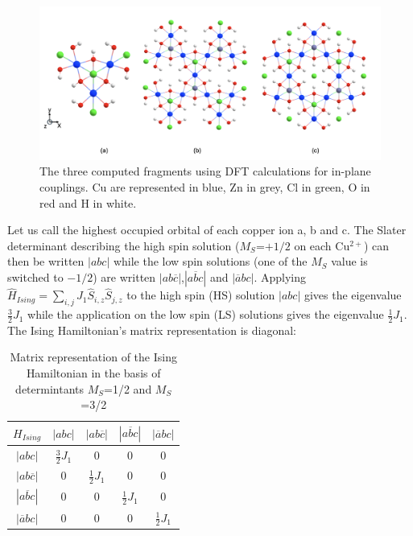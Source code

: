 \documentclass[12pt]{report}
\numberwithin{equation}{section}
\begin{document}
\begin{figure}[!ht]
    \centering
    \includegraphics[width=\textwidth]{Images/Groupir.png}
    \caption[The three computed fragments using DFT calculations for in-plane coplings.]{The three computed fragments using DFT calculations for in-plane couplings. Cu are represented in blue, Zn in grey, Cl in green, O in red and H in white.}
    \label{fig:FragmentDFT}
\end{figure}

Let us call the highest occupied orbital of each copper ion a, b and c. 
The Slater determinant describing the high spin solution ($M_S$=$+1/2$ on each Cu$^{2+}$) can then be written $|abc|$ while the low spin solutions (one of the $M_S$ value is switched to $-1/2$) are written $|ab\overline{c}|$,$|a\overline{b}c|$ and $|\overline{a}bc|$.
Applying $\hat{H}_{Ising}=\sum_{i,j}J_1 \hat{S}_{i,z}\hat{S}_{j,z}$ to the high spin (HS) solution $|abc|$ gives the eigenvalue $\frac{3}{2}J_1$ while the application on the low spin (LS) solutions gives the eigenvalue $\frac{1}{2}J_1$. 
The Ising Hamiltonian's matrix representation is diagonal:

\begin{table}[!ht]
    \centering
    \begin{tabular}{c | c c c c}
        $H_{Ising}$ & $|abc|$ & $|ab\overline{c}|$&$|a\overline{b}c|$ & $|\overline{a}bc|$\\
        \hline
        $|abc|$ & $\frac{3}{2}J_1$ & 0 & 0 & 0\\
        $|ab\overline{c}|$ & 0 & $\frac{1}{2}J_1 $& 0 & 0\\
        $|a\overline{b}c|$ & 0 & 0 & $\frac{1}{2}J_1 $ & 0 \\
        $|\overline{a}bc|$ & 0 & 0 & 0 & $\frac{1}{2}J_1 $
    \end{tabular}
    \caption{Matrix representation of the Ising Hamiltonian in the basis of determintants $M_S$=1/2 and $M_S$=3/2}
\end{table}
\end{document}
